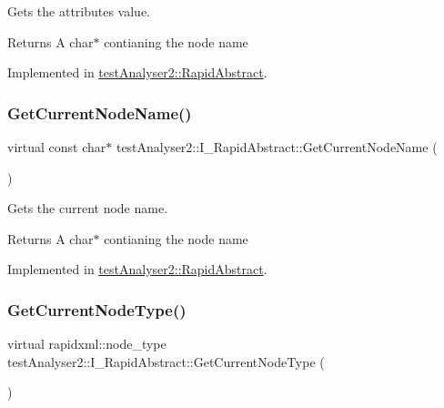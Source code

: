 Gets the attribute\textquotesingle{}s value. 

\begin{DoxyReturn}{Returns}
A char$\ast$ contianing the node name 
\end{DoxyReturn}


Implemented in \mbox{\hyperlink{classtestAnalyser2_1_1RapidAbstract_abdb39cb9f3d094518d8d3fcfb1ae0d64}{test\+Analyser2\+::\+Rapid\+Abstract}}.

\mbox{\label{classtestAnalyser2_1_1I__RapidAbstract_af94009549a9590806e5d8164ebca3c15}} 
\subsubsection{\texorpdfstring{GetCurrentNodeName()}{GetCurrentNodeName()}}
{\footnotesize\ttfamily virtual const char$\ast$ test\+Analyser2\+::\+I\+\_\+\+Rapid\+Abstract\+::\+Get\+Current\+Node\+Name (\begin{DoxyParamCaption}{ }\end{DoxyParamCaption})\hspace{0.3cm}{\ttfamily [pure virtual]}}



Gets the current node name. 

\begin{DoxyReturn}{Returns}
A char$\ast$ contianing the node name 
\end{DoxyReturn}


Implemented in \mbox{\hyperlink{classtestAnalyser2_1_1RapidAbstract_a42fff5c266c24f6149f84f3b024457c7}{test\+Analyser2\+::\+Rapid\+Abstract}}.

\mbox{\label{classtestAnalyser2_1_1I__RapidAbstract_a8da0bb607ddd98b943fc07fd5ac1abe8}} 
\subsubsection{\texorpdfstring{GetCurrentNodeType()}{GetCurrentNodeType()}}
{\footnotesize\ttfamily virtual rapidxml\+::node\+\_\+type test\+Analyser2\+::\+I\+\_\+\+Rapid\+Abstract\+::\+Get\+Current\+Node\+Type (\begin{DoxyParamCaption}{ }\end{DoxyParamCaption})\hspace{0.3cm}{\ttfamily [pure virtual]}}



